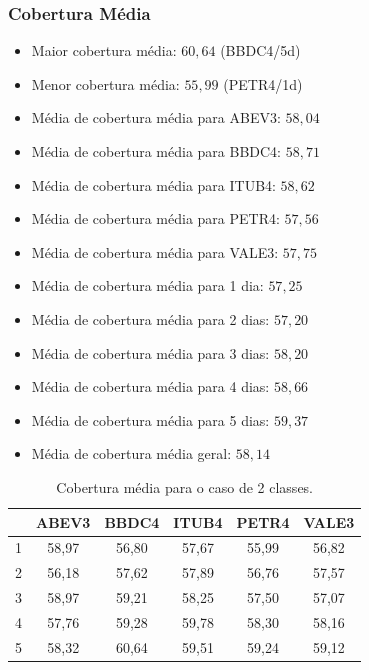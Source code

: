\documentclass[grad,numbers]{coppe}
\begin{document}
	 			\subsubsection{Cobertura Média}
					\begin{itemize}
		 				\item Maior cobertura média: $60,64$ (BBDC4/5d)
		 				\item Menor cobertura média: $55,99$ (PETR4/1d)
		 				\item Média de cobertura média para ABEV3: $58,04$
		 				\item Média de cobertura média para BBDC4: $58,71$
		 				\item Média de cobertura média para ITUB4: $58,62$
		 				\item Média de cobertura média para PETR4: $57,56$
		 				\item Média de cobertura média para VALE3: $57,75$
		 				\item Média de cobertura média para 1 dia: $57,25$
		 				\item Média de cobertura média para 2 dias: $57,20$
		 				\item Média de cobertura média para 3 dias: $58,20$
		 				\item Média de cobertura média para 4 dias: $58,66$
		 				\item Média de cobertura média para 5 dias: $59,37$
		 				\item Média de cobertura média geral: $58,14$
		 			\end{itemize}
		 			\begin{table}[h]
			 				\caption{Cobertura média para o caso de 2 classes.}
			 				\label{tab:2c_co_analysis}
			 				\centering
			 				{\footnotesize
			 					\begin{tabular}{|c|c|c|c|c|c|}
			 						\hline
			 						\diagbox[linewidth=0.2pt, width=\dimexpr \textwidth/10+2\tabcolsep\relax, height=0.8cm]{Dias}{Ativo}
			 						& ABEV3 & BBDC4 & ITUB4 & PETR4 & VALE3\\
			 						\hline
			 						1 & 58,97 & 56,80 & 57,67 & 55,99 & 56,82 \\
			 						2 & 56,18 & 57,62 & 57,89 & 56,76 & 57,57 \\
			 						3 & 58,97 & 59,21 & 58,25 & 57,50 & 57,07 \\
			 						4 & 57,76 & 59,28 & 59,78 & 58,30 & 58,16 \\
			 						5 & 58,32 & 60,64 & 59,51 & 59,24 & 59,12 \\
			 						\hline
			 				\end{tabular}}
			 			\end{table}
		 			\newpage
\end{document}
